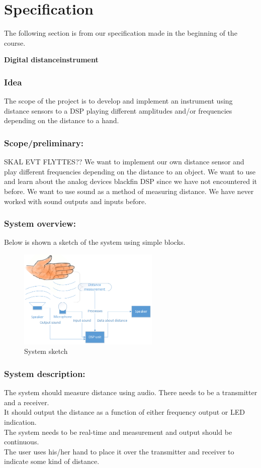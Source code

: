 \chapter{Specification}
The following section is from our specification made in the beginning of the course.\\
\begin{center}
\textbf{\HUGE Digital distanceinstrument}\\
\end{center}
\subsection{Idea}
The scope of the project is to develop and implement an instrument using distance sensors to a DSP playing different amplitudes and/or frequencies depending on the distance to a hand.\\
\subsection{Scope/preliminary:}
SKAL EVT FLYTTES??
We want to implement our own distance sensor and play different frequencies depending on the distance to an object. We want to use and learn about the analog devices blackfin DSP since we have not encountered it before. We want to use sound as a method of measuring distance. We have never worked with sound outputs and inputs before.\\
\subsection{System overview:}
Below is shown a sketch of the system using simple blocks.
\begin{figure}[H]
\centering
\includegraphics[width=0.6\textwidth]{billeder/systemoverview}
\caption{System sketch}
\label{fig:systemoverview}
\end{figure}

\subsection{System description:}
The system should measure distance using audio. There needs to be a transmitter and a receiver.\\
It should output the distance as a function of either frequency output or LED indication.\\
The system needs to be real-time and measurement and output should be continuous.\\
The user uses his/her hand to place it over the transmitter and receiver to indicate some kind of distance.\\
